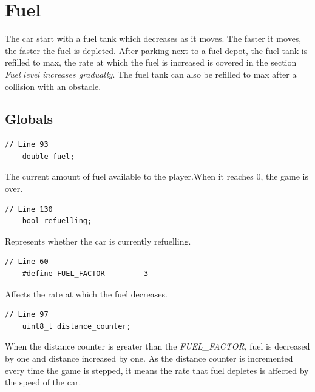 \documentclass{article}
\begin{document}
\section{Fuel}
The car start with a fuel tank which decreases as it moves. The faster it moves, the faster the fuel is depleted. After parking next to a fuel depot, the fuel tank is refilled to max, the rate at which the fuel is increased is covered in the section \emph{Fuel level increases gradually}. The fuel tank can also be refilled to max after a collision with an obstacle. 

\subsection*{Globals}
\begin{lstlisting}[style=CStyle]
	// Line 93
	double fuel;
\end{lstlisting}
The current amount of fuel available to the player.When it reaches 0, the game is over.
\begin{lstlisting}[style=CStyle]
	// Line 130
	bool refuelling;
\end{lstlisting}
Represents whether the car is currently refuelling.
\begin{lstlisting}[style=CStyle]
	// Line 60
	#define FUEL_FACTOR         3
\end{lstlisting}
Affects the rate at which the fuel decreases.
\begin{lstlisting}[style=CStyle]
	// Line 97
	uint8_t distance_counter;
\end{lstlisting}
When the distance counter is greater than the \emph{FUEL\_FACTOR}, fuel is decreased by one and distance increased by one. As the distance counter is incremented every time the game is stepped, it means  the rate that fuel depletes is affected by the speed of the car.
\newline
\end{document}

